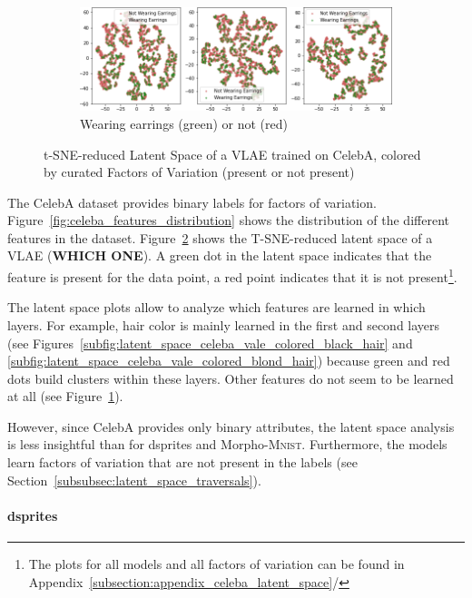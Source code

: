 \begin{figure}
\begin{subfigure}{.49\textwidth}
        \includegraphics[width=\textwidth]{images/latent_spaces/celeba/vlae/vlae_celeba_Wearing_Earrings.png}
        \caption{Wearing earrings (green) or not (red)}
        \label{subfig:latent_space_celeba_vale_colored_wearing_earrings}
    \end{subfigure}
    \caption[\ac{VLAE} Latent Space for CelebA, Curated Features]{\ac{t-SNE}-reduced Latent Space of a \ac{VLAE} trained on CelebA, colored by curated Factors of Variation (present or not present)}
    \label{fig:latent_space_celeba_vale_colored}
\end{figure}

The CelebA dataset provides binary labels for factors of variation.
Figure~\ref{fig:celeba_features_distribution} shows the distribution of the different features in the dataset.
Figure~\ref{fig:latent_space_celeba_vale_colored} shows the \ac{T-SNE}-reduced latent space of a \ac{VLAE} (\textbf{WHICH ONE}).
A green dot in the latent space indicates that the feature is present for the data point, a red point indicates that it is not present\footnote{The plots for all models and all factors of variation can be found in Appendix~\ref{subsection:appendix_celeba_latent_space}/}.

The latent space plots allow to analyze which features are learned in which layers.
For example, hair color is mainly learned in the first and second layers (see Figures~\ref{subfig:latent_space_celeba_vale_colored_black_hair} and \ref{subfig:latent_space_celeba_vale_colored_blond_hair}) because green and red dots build clusters within these layers.
Other features do not seem to be learned at all (see Figure~\ref{subfig:latent_space_celeba_vale_colored_wearing_earrings}).

However, since CelebA provides only binary attributes, the latent space analysis is less insightful than for dsprites and Morpho-\textsc{Mnist}.
Furthermore, the models learn factors of variation that are not present in the labels (see Section~\ref{subsubsec:latent_space_traversals}).

\paragraph{dsprites}


